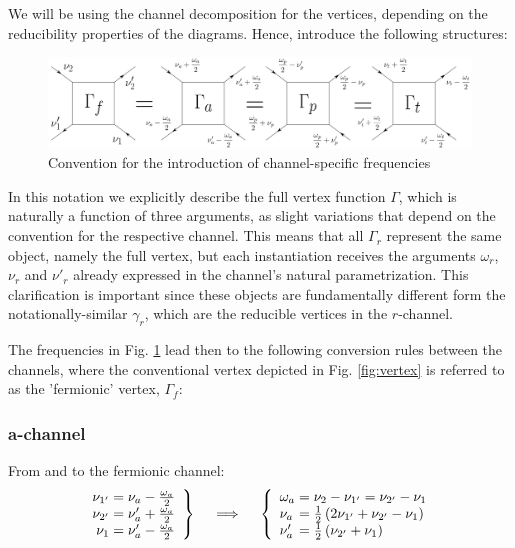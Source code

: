 \documentclass[12pt,a4paper,roman]{article}
\begin{document}
We will be using the channel decomposition for the vertices, depending on the reducibility properties of the diagrams. Hence, introduce the following structures:

\begin{figure}[ht]
    \centering
    \includegraphics[width=\linewidth]{figures/channels_with_labels.png}
    \caption{Convention for the introduction of channel-specific frequencies}
    \label{fig:channels}
\end{figure}
In this notation we explicitly describe the full vertex function $\Gamma$, which is naturally a function of three arguments, as slight variations that depend on the convention for the respective channel. This means that all $\Gamma_r$ represent the same object, namely the full vertex, but each instantiation receives the arguments $\omega_r$, $\nu_r$ and $\nu'_r$ already expressed in the channel's natural parametrization. This clarification is important since these objects are fundamentally different form the notationally-similar $\gamma_r$, which are the reducible vertices in the $r$-channel.

The frequencies in Fig. \ref{fig:channels} lead then to the following conversion rules between the channels, where the conventional vertex depicted in Fig. \ref{fig:vertex} is referred to as the 'fermionic' vertex, $\Gamma_f$:

\subsubsection*{a-channel}
From and to the fermionic channel:
\begin{align}
    \left.\begin{array}{r@{\mskip\thickmuskip}l}
    \nu_{1'} &= \nu_a - \frac{\omega_a}{2} \\
    \nu_{2'} &= \nu'_a + \frac{\omega_a}{2} \\
    \nu_{1 } &= \nu'_a - \frac{\omega_a}{2} \\
  \end{array} \right\}
  \quad \implies \quad
  \left\{\begin{array}{l@{\mskip\thickmuskip}l}
    \omega_a &= \nu_{2} - \nu_{1'} = \nu_{2'} - \nu_{1}\\
    \nu_a    &= \frac{1}{2}\left(2\nu_{1'}+\nu_{2'}-\nu_{1}\right) \\
    \nu'_a   &= \frac{1}{2}\left(\nu_{2'} + \nu_{1}\right)\\
  \end{array}\right.
\end{align}
\end{document}
